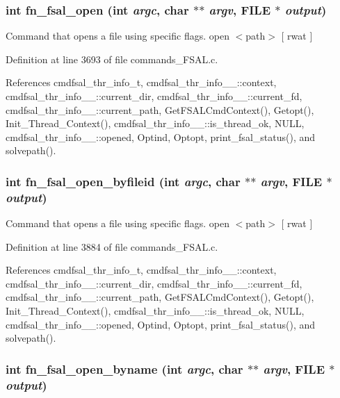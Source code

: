 \subsubsection{\setlength{\rightskip}{0pt plus 5cm}int fn\_\-fsal\_\-open (int {\em argc}, char $\ast$$\ast$ {\em argv}, FILE $\ast$ {\em output})}\label{commands__FSAL_8c_a37}


Command that opens a file using specific flags. open $<$path$>$ [ rwat ] 

Definition at line 3693 of file commands\_\-FSAL.c.

References cmdfsal\_\-thr\_\-info\_\-t, cmdfsal\_\-thr\_\-info\_\-\_\-::context, cmdfsal\_\-thr\_\-info\_\-\_\-::current\_\-dir, cmdfsal\_\-thr\_\-info\_\-\_\-::current\_\-fd, cmdfsal\_\-thr\_\-info\_\-\_\-::current\_\-path, Get\-FSALCmd\-Context(), Getopt(), Init\_\-Thread\_\-Context(), cmdfsal\_\-thr\_\-info\_\-\_\-::is\_\-thread\_\-ok, NULL, cmdfsal\_\-thr\_\-info\_\-\_\-::opened, Optind, Optopt, print\_\-fsal\_\-status(), and solvepath().
\subsubsection{\setlength{\rightskip}{0pt plus 5cm}int fn\_\-fsal\_\-open\_\-byfileid (int {\em argc}, char $\ast$$\ast$ {\em argv}, FILE $\ast$ {\em output})}\label{commands__FSAL_8c_a38}


Command that opens a file using specific flags. open $<$path$>$ [ rwat ] 

Definition at line 3884 of file commands\_\-FSAL.c.

References cmdfsal\_\-thr\_\-info\_\-t, cmdfsal\_\-thr\_\-info\_\-\_\-::context, cmdfsal\_\-thr\_\-info\_\-\_\-::current\_\-dir, cmdfsal\_\-thr\_\-info\_\-\_\-::current\_\-fd, cmdfsal\_\-thr\_\-info\_\-\_\-::current\_\-path, Get\-FSALCmd\-Context(), Getopt(), Init\_\-Thread\_\-Context(), cmdfsal\_\-thr\_\-info\_\-\_\-::is\_\-thread\_\-ok, NULL, cmdfsal\_\-thr\_\-info\_\-\_\-::opened, Optind, Optopt, print\_\-fsal\_\-status(), and solvepath().
\subsubsection{\setlength{\rightskip}{0pt plus 5cm}int fn\_\-fsal\_\-open\_\-byname (int {\em argc}, char $\ast$$\ast$ {\em argv}, FILE $\ast$ {\em output})}\label{commands__FSAL_8c_a36}


